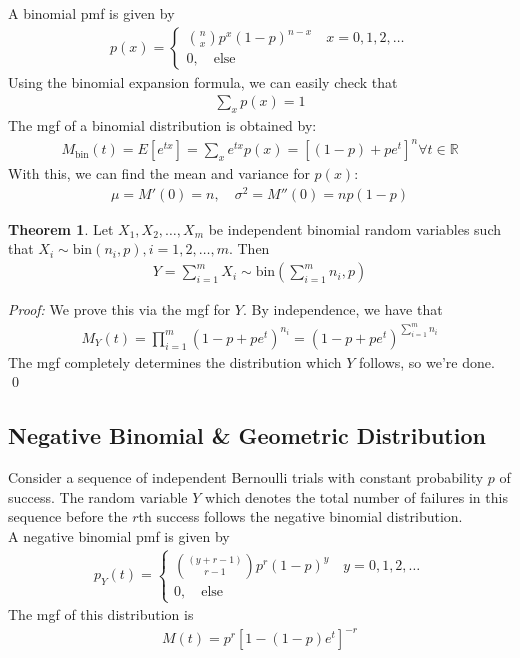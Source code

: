 \documentclass{book}
\theoremstyle{definition}
\newtheorem{thm}{Theorem}[section]
\newcommand{\R}{\mathbb{R}}
\newcommand{\lp}{\left(}
\newcommand{\rp}{\right)}
\newcommand{\lb}{\left[}
\newcommand{\rb}{\right]}
\begin{document}
A binomial pmf is given by
\begin{align}
\boxed{p(x) = \begin{cases}
{n\choose x}p^x(1-p)^{n-x} \quad x=0,1,2,\dots \\
0, \quad \text{else}
\end{cases}}
\end{align}
Using the binomial expansion formula, we can easily check that
\begin{align}
\boxed{\sum_x p(x) = 1}
\end{align}
The mgf of a binomial distribution is obtained by:
\begin{align}
\boxed{M_{\text{bin}}(t) = E[e^{tx}] = \sum_x e^{tx}p(x) = \lb (1-p) + pe^t \rb^n \forall t \in \R}
\end{align}
With this, we can find the mean and variance for $p(x)$:
\begin{align}
\boxed{\mu = M'(0) = n, \quad \sigma^2 = M''(0) = np(1-p)}
\end{align}

\begin{thm} Let $X_1, X_2, \dots, X_m$ be independent binomial random variables such that $X_i \sim \text{bin}(n_i, p), i = 1,2,\dots,m$. Then 
\begin{align}
\boxed{Y = \sum^m_{i=1} X_i \sim \text{bin}\lp \sum^m_{i=1}n_i, p \rp}
\end{align}
\end{thm}
\noindent \textit{Proof:} We prove this via the mgf for $Y$. By independence, we have that
\begin{align}
M_Y(t) = \prod^m_{i=1}(1-p + pe^t)^{n_i} = (1-p + pe^t)^{\sum^m_{i=1} n_i}
\end{align}
The mgf completely determines the distribution which $Y$ follows, so we're done. \qed



\subsection{Negative Binomial \& Geometric Distribution}
Consider a sequence of independent Bernoulli trials with constant probability $p$ of success. The random variable $Y$ which denotes the total number of failures in this sequence before the $r$th success follows the negative binomial distribution.\\


A negative binomial pmf is given by
\begin{align}
\boxed{p_Y(t) = \begin{cases}
{(y+r-1)\choose{r-1}}p^r(1-p)^y \quad y = 0,1,2,\dots\\
0, \quad \text{else}
\end{cases}}
\end{align} 
The mgf of this distribution is 
\begin{align}
\boxed{M(t) = p^r[1-(1-p)e^{t}]^{-r}}
\end{align}
 
\end{document}
